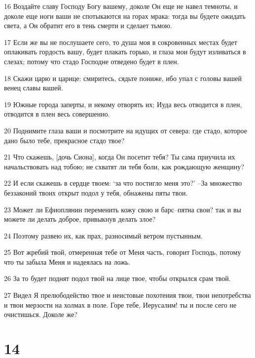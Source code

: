\par 16 Воздайте славу Господу Богу вашему, доколе Он еще не навел темноты, и доколе еще ноги ваши не спотыкаются на горах мрака: тогда вы будете ожидать света, а Он обратит его в тень смерти и сделает тьмою.
\par 17 Если же вы не послушаете сего, то душа моя в сокровенных местах будет оплакивать гордость вашу, будет плакать горько, и глаза мои будут изливаться в слезах; потому что стадо Господне отведено будет в плен.
\par 18 Скажи царю и царице: смиритесь, сядьте пониже, ибо упал с головы вашей венец славы вашей.
\par 19 Южные города заперты, и некому отворять их; Иуда весь отводится в плен, отводится в плен весь совершенно.
\par 20 Поднимите глаза ваши и посмотрите на идущих от севера: где стадо, которое дано было тебе, прекрасное стадо твое?
\par 21 Что скажешь, [дочь Сиона], когда Он посетит тебя? Ты сама приучила их начальствовать над тобою; не схватят ли тебя боли, как рождающую женщину?
\par 22 И если скажешь в сердце твоем: `за что постигло меня это?' --За множество беззаконий твоих открыт подол у тебя, обнажены пяты твои.
\par 23 Может ли Ефиоплянин переменить кожу свою и барс--пятна свои? так и вы можете ли делать доброе, привыкнув делать злое?
\par 24 Поэтому развею их, как прах, разносимый ветром пустынным.
\par 25 Вот жребий твой, отмеренная тебе от Меня часть, говорит Господь, потому что ты забыла Меня и надеялась на ложь.
\par 26 За то будет поднят подол твой на лице твое, чтобы открылся срам твой.
\par 27 Видел Я прелюбодейство твое и неистовые похотения твои, твои непотребства и твои мерзости на холмах в поле. Горе тебе, Иерусалим! ты и после сего не очистишься. Доколе же?

\chapter{14}

